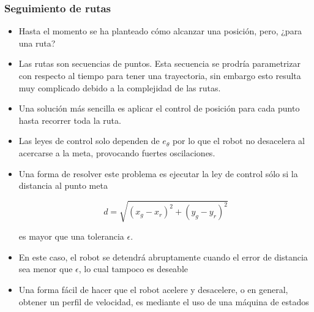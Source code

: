 \documentclass[10pt,spanish,aspectratio=1610]{beamer}
\begin{document}
\begin{frame}\frametitle{Seguimiento de rutas}
  \begin{itemize}
  \item Hasta el momento se ha planteado cómo alcanzar una posición, pero, ¿para una ruta?
  \item Las rutas son secuencias de puntos. Esta secuencia se prodría parametrizar con respecto al tiempo para tener una trayectoria, sin embargo esto resulta muy complicado debido a la complejidad de las rutas.
  \item Una solución más sencilla es aplicar el control de posición para cada punto hasta recorrer toda la ruta.
  \item Las leyes de control solo dependen de $e_\theta$ por lo que el robot no desacelera al acercarse a la meta, provocando fuertes oscilaciones.
  \item Una forma de resolver este problema es ejecutar la ley de control sólo si la distancia al punto meta 

    \[d=\sqrt{(x_g - x_r)^2 + (y_g - y_r)^2}\] 
    
    es mayor que una tolerancia $\epsilon$.
  \item En este caso, el robot se detendrá abruptamente cuando el error de distancia sea menor que $\epsilon$, lo cual tampoco es deseable
  \item Una forma fácil de hacer que el robot acelere y desacelere, o en general, obtener un perfil de velocidad, es mediante el uso de una máquina de estados
    
  \end{itemize}
\end{frame}
\end{document}
